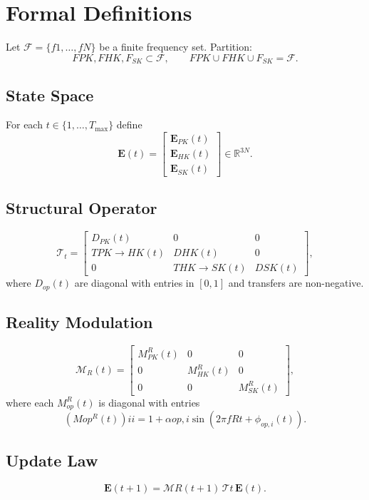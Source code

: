\documentclass[11pt]{article}
\begin{document}
\section{Formal Definitions}

Let $\mathcal{F}=\{f1,\dots,fN\}$ be a finite frequency set. Partition:
\[
F{PK}, F{HK}, F_{SK} \subset \mathcal{F}, \qquad
F{PK}\cup F{HK}\cup F_{SK}=\mathcal{F}.
\]

\subsection{State Space}

For each $t\in\{1,\dots,T_{\max}\}$ define
\[
\mathbf{E}(t)=
\begin{bmatrix}
\mathbf{E}_{PK}(t)\\
\mathbf{E}_{HK}(t)\\
\mathbf{E}_{SK}(t)
\end{bmatrix}
\in \mathbb{R}^{3N}.
\]

\subsection{Structural Operator}

\[
\mathcal{T}_t=
\begin{bmatrix}
D_{PK}(t) & 0 & 0\\
T{PK\to HK}(t) & D{HK}(t) & 0\\
0 & T{HK\to SK}(t) & D{SK}(t)
\end{bmatrix},
\]
where $D_{op}(t)$ are diagonal with entries in $[0,1]$ and transfers are 
non-negative.

\subsection{Reality Modulation}

\[
\mathcal{M}_R(t)=
\begin{bmatrix}
M_{PK}^R(t) & 0 & 0\\
0 & M_{HK}^R(t) & 0\\
0 & 0 & M_{SK}^R(t)
\end{bmatrix},
\]
where each $M_{op}^R(t)$ is diagonal with entries
\[
(M{op}^R(t)){ii}=1+\alpha{op,i}\sin(2\pi fR t+\phi_{op,i}(t)).
\]

\subsection{Update Law}

\[
\mathbf{E}(t+1)=\mathcal{M}R(t+1)\,\mathcal{T}t\,\mathbf{E}(t).
\]
\end{document}
